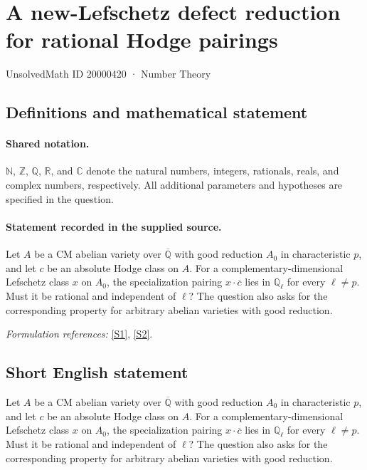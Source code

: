 \documentclass[11pt]{article}
\newcommand{\sref}[2]{\hyperlink{source:#1:#2}{[S#2]}}
\begin{document}
\setcounter{section}{20000419}
\section{A new-Lefschetz defect reduction for rational Hodge pairings}\label{20000420}
{\small UnsolvedMath ID 20000420 · Number Theory}
\subsection{Definitions and mathematical statement}

\paragraph{Shared notation.}$\mathbb N$, $\mathbb Z$, $\mathbb Q$, $\mathbb R$, and $\mathbb C$ denote the natural numbers, integers, rationals, reals, and complex numbers, respectively. All additional parameters and hypotheses are specified in the question.


\paragraph{Statement recorded in the supplied source.}
Let $A$ be a CM abelian variety over $\overline{\mathbb Q}$ with good reduction $A_0$ in characteristic $p$, and let $c$ be an absolute Hodge class on $A$. For a complementary-dimensional Lefschetz class $x$ on $A_0$, the specialization pairing $x\cdot\overline c$ lies in $\mathbb Q_\ell$ for every $\ell\neq p$. Must it be rational and independent of $\ell$? The question also asks for the corresponding property for arbitrary abelian varieties with good reduction.
\par\smallskip\textit{Formulation references:} \sref{20000420}{1}, \sref{20000420}{2}.
\subsection{Short English statement}
Let $A$ be a CM abelian variety over $\overline{\mathbb Q}$ with good reduction $A_0$ in characteristic $p$, and let $c$ be an absolute Hodge class on $A$. For a complementary-dimensional Lefschetz class $x$ on $A_0$, the specialization pairing $x\cdot\overline c$ lies in $\mathbb Q_\ell$ for every $\ell\neq p$. Must it be rational and independent of $\ell$? The question also asks for the corresponding property for arbitrary abelian varieties with good reduction.
\end{document}
